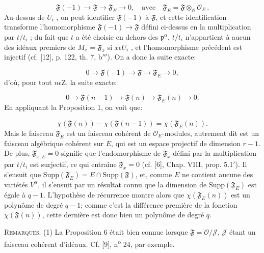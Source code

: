 \begin{equation*}
\mathfrak{F}(-1) \to \mathfrak{F} \to \mathfrak{F}_E \to 0, \quad \mathrm{avec} \quad \mathfrak{F}_E = \mathfrak{F} \otimes_{\mathcal{O}} \mathcal{O}_E \, .
\end{equation*}
Au-dessus de $U_i$ , on peut identifier $\mathfrak{F}(-1)$ à $\mathfrak{F}$, et cette identification transforme l'homomorphisme $\mathfrak{F}(-1) \to \mathfrak{F}$ défini ci-dessus en la multiplication par $t/t_i$ ; du fait que $t$ a été choisie en dehors des $\mathfrak{p}^\alpha$, $t/t_i$ n'appartient à aucun des idéaux premiers de $M_x = \mathfrak{F}_x$ si $x \epsilon U_i$ , et l'homomorphisme précédent est injectif (cf. [12], p. 122, th. 7, b$'''$). On a donc la suite exacte:

\begin{equation*}
0 \to \mathfrak{F}(-1) \to \mathfrak{F} \to \mathfrak{F}_E \to 0,
\end{equation*}
d'où, pour tout $n \epsilon \mathrm{Z}$, la suite exacte:

\begin{equation*}
0 \to \mathfrak{F}(n - 1) \to \mathfrak{F}(n) \to \mathfrak{F}_E(n) \to 0.
\end{equation*}
En appliquant la Proposition 1, on voit que:

\begin{equation*}
\chi(\mathfrak{F}(n)) - \chi(\mathfrak{F}(n - 1)) = \chi(\mathfrak{F}_E(n)).
\end{equation*}
Mais le faisceau $\mathfrak{F}_E$ est un faisceau cohérent de $\mathcal{O}_E$-modules, autrement dit est un faisceau algébrique cohérent sur $E$, qui est un espace projectif de dimension $r - 1$. De plus, $\mathfrak{F}_{x,E} = 0$ signifie que l'endomorphisme de $\mathfrak{F}_x$ défini par la multiplication par $t/t_i$ est surjectif, ce qui entraîne $\mathfrak{F}_x = 0$ (cf. [6], Chap. VIII, prop. 5.1$'$). Il s'ensuit que $\mathrm{Supp}(\mathfrak{F}_E) = E \cap \mathrm{Supp}(\mathfrak{F})$, et, comme $E$ ne contient aucune des variétés $V^\alpha$, il s'ensuit par un résultat connu que la dimension de $\mathrm{Supp}(\mathfrak{F}_E)$ est égale à $q - 1$. L'hypothèse de récurrence montre alors que $\chi(\mathfrak{F}_E(n))$ est un polynôme de degré $q - 1$; comme c'est la différence première de la fonction $\chi(\mathfrak{F}(n))$, cette dernière est donc bien un polynôme de degré $q$.

\textsc{Remarques}. (1) La Proposition 6 était bien connue lorsque $\mathfrak{F} = \mathcal{O}/\mathcal{J}$, $\mathcal{J}$ étant un faisceau cohérent d'idéaux. Cf. [9], n\textsuperscript{o} 24, par exemple.

